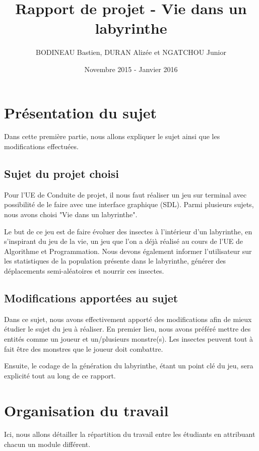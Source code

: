 \documentclass[a4paper,11pt]{report}
\title{Rapport de projet - Vie dans un labyrinthe}
\author{BODINEAU Bastien, DURAN Alizée et NGATCHOU Junior}
\date{Novembre 2015 - Janvier 2016}
\begin{document}
\maketitle
\tableofcontents

\chapter{Présentation du sujet}
Dans cette première partie, nous allons expliquer le sujet ainsi que les modifications effectuées.
\section{Sujet du projet choisi}
Pour l'UE de Conduite de projet, il nous faut réaliser un jeu sur terminal avec possibilité de le faire avec une interface graphique (SDL). Parmi plusieurs sujets, nous avons choisi "Vie dans un labyrinthe". 

Le but de ce jeu est de faire évoluer des insectes à l'intérieur d'un labyrinthe, en s'inspirant du jeu de la vie, un jeu que l'on a déjà réalisé au cours de l'UE de Algorithme et Programmation. Nous devons également informer l'utilisateur sur les statistiques de la population présente dans le labyrinthe, générer des déplacements semi-aléatoires et nourrir ces insectes.
\section{Modifications apportées au sujet}
Dans ce sujet, nous avons effectivement apporté des modifications afin de mieux étudier le sujet du jeu à réaliser. En premier lieu, nous avons préféré mettre des entités comme un joueur et un/plusieurs monstre(s). Les insectes peuvent tout à fait être des monstres que le joueur doit combattre.

Ensuite, le codage de la génération du labyrinthe, étant un point clé du jeu, sera explicité tout au long de ce rapport.
\chapter{Organisation du travail}
Ici, nous allons détailler la répartition du travail entre les étudiants en attribuant chacun un module différent.
\end{document}
